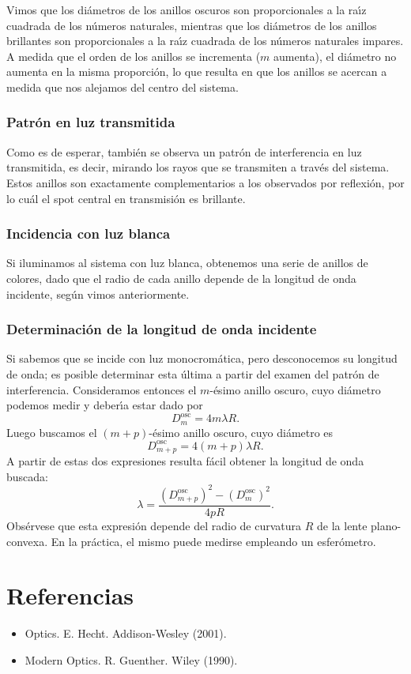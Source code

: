 \documentclass[a4paper]{article}
\begin{document}
Vimos que los di\'ametros de los anillos oscuros son proporcionales a la 
ra\'\i z cuadrada de los n\'umeros naturales, mientras que los di\'ametros de 
los anillos brillantes son proporcionales a la ra\'\i z cuadrada de los 
n\'umeros naturales impares. A medida que el orden de los anillos se 
incrementa ($m$ aumenta), el di\'ametro no aumenta en la misma proporci\'on,
lo que resulta en que los anillos se acercan a medida que nos alejamos
del centro del sistema. 

\subsubsection{Patr\'on en luz transmitida}

Como es de esperar, tambi\'en se observa un patr\'on de interferencia en 
luz transmitida, es decir, mirando los rayos que se transmiten a trav\'es del
sistema. Estos anillos son exactamente complementarios a los observados por
reflexi\'on, por lo cu\'al el spot central en transmisi\'on es brillante. 

\subsubsection{Incidencia con luz blanca}

Si iluminamos al sistema con luz blanca, obtenemos una serie de anillos de
colores, dado que el radio de cada anillo depende de la longitud de onda
incidente, seg\'un vimos anteriormente.

\subsubsection{Determinaci\'on de la longitud de onda incidente}

Si sabemos que se incide con luz monocrom\'atica, pero desconocemos su longitud
de onda; es posible determinar esta \'ultima a partir del examen del patr\'on
de interferencia. Consideramos entonces el $m$-\'esimo anillo oscuro, cuyo
di\'ametro podemos medir y deber\'\i a estar dado por
\begin{equation}
    D_m^\text{osc} = 4 m \lambda R.
\end{equation}
Luego buscamos el $(m+p)$-\'esimo anillo oscuro, cuyo di\'ametro es
\begin{equation}
    D_{m+p}^\text{osc} = 4 (m+p) \lambda R.
\end{equation}
A partir de estas dos expresiones resulta f\'acil obtener la longitud de 
onda buscada:
\begin{equation}
    \lambda = \frac{\left(D_{m+p}^\text{osc}\right)^2 - 
    \left(D_{m}^\text{osc}\right)^2}{4 p R}.
\end{equation}
Obs\'ervese que esta expresi\'on depende del radio de curvatura $R$ de la lente
plano-convexa. En la pr\'actica, el mismo puede medirse empleando un 
esfer\'ometro.


\section*{Referencias}
\begin{itemize}
    \item Optics. E. Hecht. Addison-Wesley (2001).
    \item Modern Optics. R. Guenther. Wiley (1990). 
\end{itemize}
\end{document}
